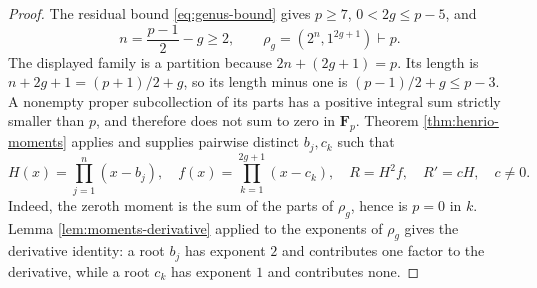 \documentclass[11pt]{amsart}
\theoremstyle{plain}
\theoremstyle{definition}
\numberwithin{equation}{section}
\begin{document}
\begin{proof}
The residual bound \eqref{eq:genus-bound} gives
$p\geq7$, $0<2g\leq p-5$, and
\[
 n=\frac{p-1}{2}-g\geq2,\qquad
 \rho_g=(2^n,1^{2g+1})\vdash p.
 \label{eq:aux-partition}
\]
The displayed family is a partition because
$2n+(2g+1)=p$.  Its length is
$n+2g+1=(p+1)/2+g$, so its length minus one is
$(p-1)/2+g\leq p-3$.  A nonempty proper subcollection of its parts has a
positive integral sum strictly smaller than $p$, and therefore does not sum
to zero in $\mathbf F_p$.  Theorem \ref{thm:henrio-moments} applies and
supplies pairwise distinct $b_j,c_k$ such that
\[
 H(x)=\prod_{j=1}^n(x-b_j),\quad
 f(x)=\prod_{k=1}^{2g+1}(x-c_k),\quad
 R=H^2f,\quad R'=cH,\quad c\neq0.
 \label{eq:new-derivative}
\]
Indeed, the zeroth moment is the sum of the parts of $\rho_g$, hence is
$p=0$ in $k$.  Lemma \ref{lem:moments-derivative} applied to the exponents
of $\rho_g$ gives the derivative identity: a root $b_j$ has exponent $2$
and contributes one factor to the derivative, while a root $c_k$ has
exponent $1$ and contributes none.


\end{proof}
\end{document}
